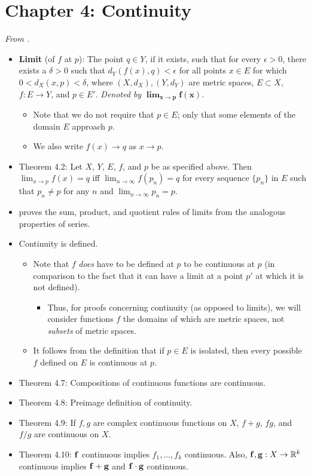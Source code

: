 \documentclass[../../notes.tex]{subfiles}
\begin{document}
\section{Chapter 4: Continuity}
\emph{From \textcite{bib:Rudin}.}
\begin{itemize}
    \item \textbf{Limit} (of $f$ at $p$): The point $q\in Y$, if it exists, such that for every $\epsilon>0$, there exists a $\delta>0$ such that $d_Y(f(x),q)<\epsilon$ for all points $x\in E$ for which $0<d_X(x,p)<\delta$, where $(X,d_X),(Y,d_Y)$ are metric spaces, $E\subset X$, $f:E\to Y$, and $p\in E'$. \emph{Denoted by} $\bm{\lim_{x\to p}f(x)}$.
    \begin{itemize}
        \item Note that we do not require that $p\in E$; only that some elements of the domain $E$ approach $p$.
        \item We also write $f(x)\to q$ as $x\to p$.
    \end{itemize}
    \item Theorem 4.2: Let $X$, $Y$, $E$, $f$, and $p$ be as specified above. Then $\lim_{x\to p}f(x)=q$ iff $\lim_{n\to\infty}f(p_n)=q$ for every sequence $\{p_n\}$ in $E$ such that $p_n\neq p$ for any $n$ and $\lim_{n\to\infty}p_n=p$.
    \item \textcite{bib:Rudin} proves the sum, product, and quotient rules of limits from the analogous properties of series.
    \item Continuity is defined.
    \begin{itemize}
        \item Note that $f$ \emph{does} have to be defined at $p$ to be continuous at $p$ (in comparison to the fact that it can have a limit at a point $p'$ at which it is not defined).
        \begin{itemize}
            \item Thus, for proofs concerning continuity (as opposed to limits), we will consider functions $f$ the domains of which are metric spaces, not \emph{subsets} of metric spaces.
        \end{itemize}
        \item It follows from the definition that if $p\in E$ is isolated, then every possible $f$ defined on $E$ is continuous at $p$.
    \end{itemize}
    \item Theorem 4.7: Compositions of continuous functions are continuous.
    \item Theorem 4.8: Preimage definition of continuity.
    \item Theorem 4.9: If $f,g$ are complex continuous functions on $X$, $f+g$, $fg$, and $f/g$ are continuous on $X$.
    \item Theorem 4.10: $\mathbf{f}$ continuous implies $f_1,\dots,f_k$ continuous. Also, $\mathbf{f},\mathbf{g}:X\to\mathbb{R}^k$ continuous implies $\mathbf{f}+\mathbf{g}$ and $\mathbf{f}\cdot\mathbf{g}$ continuous.
\end{itemize}
\end{document}
